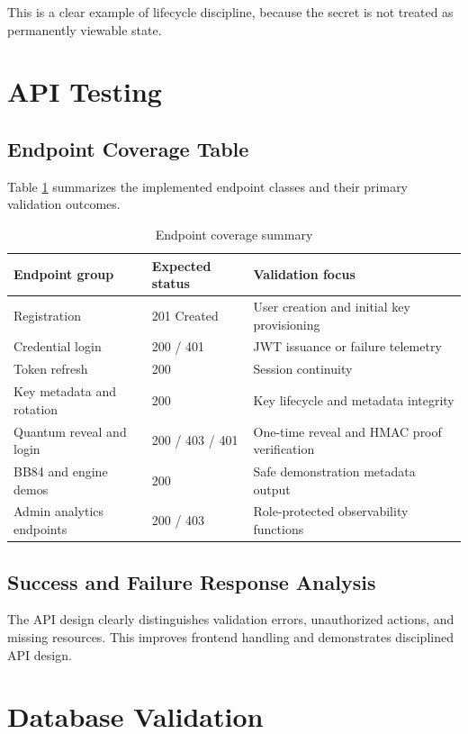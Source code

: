 \documentclass[12pt,a4paper]{report}
\begin{document}
This is a clear example of lifecycle discipline, because the secret is not treated as permanently viewable state.

\section{API Testing}

\subsection{Endpoint Coverage Table}
Table \ref{tab:endpoint-coverage} summarizes the implemented endpoint classes and their primary validation outcomes.

\begin{table}[H]
\centering
\small
\caption{Endpoint coverage summary}
\label{tab:endpoint-coverage}
\begin{tabular}{|p{4.0cm}|p{3.2cm}|p{5.8cm}|}
\hline
\textbf{Endpoint group} & \textbf{Expected status} & \textbf{Validation focus} \\
\hline
Registration & 201 Created & User creation and initial key provisioning \\
\hline
Credential login & 200 / 401 & JWT issuance or failure telemetry \\
\hline
Token refresh & 200 & Session continuity \\
\hline
Key metadata and rotation & 200 & Key lifecycle and metadata integrity \\
\hline
Quantum reveal and login & 200 / 403 / 401 & One-time reveal and HMAC proof verification \\
\hline
BB84 and engine demos & 200 & Safe demonstration metadata output \\
\hline
Admin analytics endpoints & 200 / 403 & Role-protected observability functions \\
\hline
\end{tabular}
\end{table}

\subsection{Success and Failure Response Analysis}
The API design clearly distinguishes validation errors, unauthorized actions, and missing resources. This improves frontend handling and demonstrates disciplined API design.

\section{Database Validation}
\end{document}
